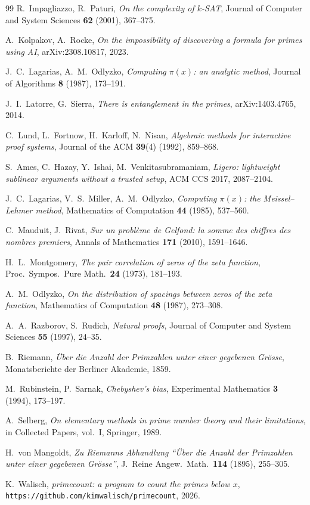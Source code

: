 \documentclass[11pt]{article}
\theoremstyle{plain}
\theoremstyle{definition}
\theoremstyle{remark}
\begin{document}
\begin{thebibliography}{99}
 R.~Impagliazzo, R.~Paturi, \emph{On the complexity of $k$-SAT}, Journal of Computer and System Sciences \textbf{62} (2001), 367--375.

 A.~Kolpakov, A.~Rocke, \emph{On the impossibility of discovering a formula for primes using AI}, arXiv:2308.10817, 2023.

 J.~C.~Lagarias, A.~M.~Odlyzko, \emph{Computing $\pi(x)$: an analytic method}, Journal of Algorithms \textbf{8} (1987), 173--191.

 J.~I.~Latorre, G.~Sierra, \emph{There is entanglement in the primes}, arXiv:1403.4765, 2014.

 C.~Lund, L.~Fortnow, H.~Karloff, N.~Nisan, \emph{Algebraic methods for interactive proof systems}, Journal of the ACM \textbf{39}(4) (1992), 859--868.

 S.~Ames, C.~Hazay, Y.~Ishai, M.~Venkitasubramaniam, \emph{Ligero: lightweight sublinear arguments without a trusted setup}, ACM CCS 2017, 2087--2104.

 J.~C.~Lagarias, V.~S.~Miller, A.~M.~Odlyzko, \emph{Computing $\pi(x)$: the Meissel--Lehmer method}, Mathematics of Computation \textbf{44} (1985), 537--560.

 C.~Mauduit, J.~Rivat, \emph{Sur un probl\`eme de Gelfond: la somme des chiffres des nombres premiers}, Annals of Mathematics \textbf{171} (2010), 1591--1646.

 H.~L.~Montgomery, \emph{The pair correlation of zeros of the zeta function}, Proc.\ Sympos.\ Pure Math.\ \textbf{24} (1973), 181--193.

 A.~M.~Odlyzko, \emph{On the distribution of spacings between zeros of the zeta function}, Mathematics of Computation \textbf{48} (1987), 273--308.

 A.~A.~Razborov, S.~Rudich, \emph{Natural proofs}, Journal of Computer and System Sciences \textbf{55} (1997), 24--35.

 B.~Riemann, \emph{\"Uber die Anzahl der Primzahlen unter einer gegebenen Gr\"osse}, Monatsberichte der Berliner Akademie, 1859.

 M.~Rubinstein, P.~Sarnak, \emph{Chebyshev's bias}, Experimental Mathematics \textbf{3} (1994), 173--197.

 A.~Selberg, \emph{On elementary methods in prime number theory and their limitations}, in Collected Papers, vol.~I, Springer, 1989.

 H.~von Mangoldt, \emph{Zu Riemanns Abhandlung ``\"Uber die Anzahl der Primzahlen unter einer gegebenen Gr\"osse''}, J.\ Reine Angew.\ Math.\ \textbf{114} (1895), 255--305.

 K.~Walisch, \emph{primecount: a program to count the primes below $x$}, \texttt{https://github.com/kimwalisch/primecount}, 2026.

\end{thebibliography}
\end{document}
